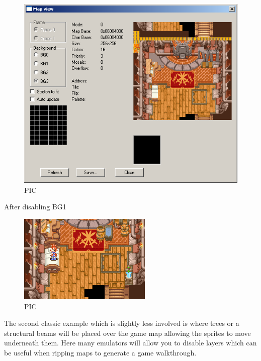 \documentclass[
]{book}
\begin{document}
\begin{figure}
\centering
\includegraphics{images/41_home_fast6191_romhackingguide_unrenamed_file___original_borders_romhackingguideBGlayering5.png}
\caption{PIC}
\end{figure}

After disabling BG1

\begin{figure}
\centering
\includegraphics{images/42_home_fast6191_romhackingguide_unrenamed_file___original_borders_romhackingguideBGlayering6.png}
\caption{PIC}
\end{figure}

The second classic example which is slightly less involved is where trees or a structural beams will be placed over the game map allowing the sprites to move underneath them. Here many emulators will allow you to disable layers which can be useful when ripping maps to generate a game walkthrough.
\end{document}

